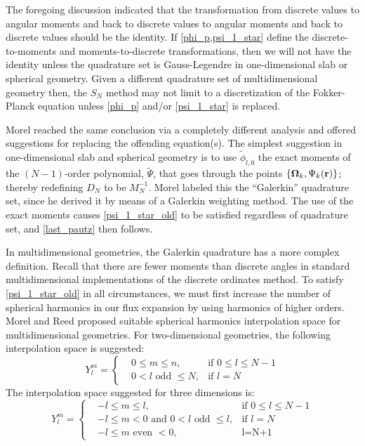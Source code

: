 The foregoing discussion indicated that the transformation from discrete
values to angular moments and back to discrete values to angular moments and
back to discrete values should be the identity. If \cref{phi_p,psi_1_star} define 
the discrete-to-moments and moments-to-discrete transformations, then we will 
not have the identity unless the quadrature set is Gauss-Legendre in one-dimensional 
slab or spherical geometry. Given a different quadrature set of multidimensional 
geometry then, the $S_N$ method may not limit to a discretization of the 
Fokker-Planck equation unless \cref{phi_p} and/or \cref{psi_1_star} is replaced.

Morel\cite{galerkin_morel} reached the same conclusion via a completely
different analysis and offered suggestions for replacing the offending
equation(s). The simplest suggestion in one-dimensional slab and spherical
geometry is to use $\tilde{\phi}_{l,0}$ the exact moments of the $(N-1)$-order
polynomial, $\tilde{\Psi}$, that goes through the points
$\{\boldsymbol{\Omega}_k,\Psi_k(\mathbf{r})\}$; thereby redefining $D_N$ to be $M_N^{-1}$. Morel
labeled this the ``Galerkin'' quadrature set, since he derived it by means of
a Galerkin weighting method. The use of the exact moments causes
\cref{psi_1_star_old} to be satisfied regardless of quadrature set, and
\cref{last_pautz} then follows.

In multidimensional geometries, the Galerkin quadrature has a more complex
definition. Recall that there are fewer moments than discrete angles in
standard multidimensional implementations of the discrete ordinates method.
To satisfy \cref{psi_1_star_old} in all circumstances, we must first
increase the number of spherical harmonics in our flux expansion by using
harmonics of higher orders. Morel\cite{galerkin_morel} and Reed\cite{reed}
proposed suitable spherical harmonics interpolation space for multidimensional
geometries. For two-dimensional geometries, the following interpolation space
is suggested:
\begin{equation}
Y_l^m = \left\{
\begin{aligned}
&0\leq m \leq n, & \textrm{if }0\leq l\leq N-1 \\
&0< l\textrm{ odd }\leq N, & \textrm{if }l=N
\end{aligned}
\right.
\end{equation}
The interpolation space suggested for three dimensions is:
\begin{equation}
Y_l^m = \left\{
\begin{aligned}
&-l\leq m \leq l, & \textrm{if }0\leq l \leq N-1\\
&-l\leq m <0 \textrm{ and } 0<l\textrm{ odd }\leq l, & \textrm{if }l=N\\
&-l\leq m\textrm{ even }<0,& \textrm{l=N+1}
\end{aligned}
\right.
\end{equation}

